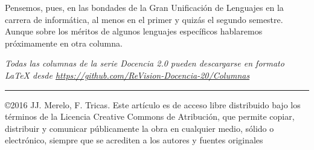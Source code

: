 \documentclass[twoside,10pt]{article}
\newcommand{\surl}[1]{{\small\url{#1}}}
\begin{document}
\begin{multicols}{2}
Pensemos, pues, en las bondades de la Gran Unificación de Lenguajes en
la carrera de informática, al menos en el primer y quizás el segundo
semestre. 
Aunque sobre los méritos de algunos lenguajes específicos hablaremos
próximamente en otra columna. 

\noindent  
\bigskip

\noindent\emph{Todas las columnas de la serie Docencia 2.0
pueden descargarse en formato LaTeX desde
\surl{https://github.com/ReVision-Docencia-20/Columnas}}

\noindent\rule{90mm}{1pt}

{\small \noindent\copyright 2016 JJ. Merelo, F. Tricas. Este artículo es de acceso libre distribuido bajo los t\'{e}rminos
de la Licencia Creative Commons de Atribuci\'{o}n, que permite copiar,
distribuir y comunicar p\'{u}blicamente la obra en cualquier medio, s\'{o}lido
o electr\'{o}nico, siempre que se acrediten a los autores y fuentes
originales}

\end{multicols}
\end{document}
